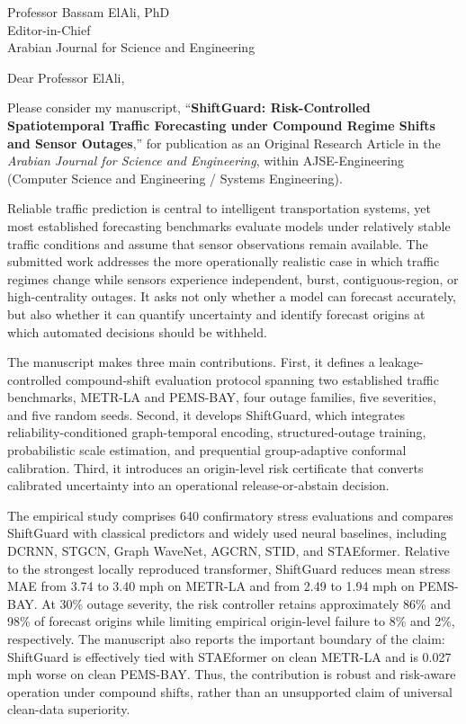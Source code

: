 \documentclass[10pt]{letter}
\begin{document}
\begin{letter}{Professor Bassam ElAli, PhD\\
Editor-in-Chief\\
Arabian Journal for Science and Engineering}

\opening{Dear Professor ElAli,}

Please consider my manuscript, ``\textbf{ShiftGuard: Risk-Controlled
Spatiotemporal Traffic Forecasting under Compound Regime Shifts and Sensor
Outages},'' for publication as an Original Research Article in the
\textit{Arabian Journal for Science and Engineering}, within AJSE-Engineering
(Computer Science and Engineering / Systems Engineering).

Reliable traffic prediction is central to intelligent transportation systems,
yet most established forecasting benchmarks evaluate models under relatively
stable traffic conditions and assume that sensor observations remain
available. The submitted work addresses the more operationally realistic case
in which traffic regimes change while sensors experience independent, burst,
contiguous-region, or high-centrality outages. It asks not only whether a model
can forecast accurately, but also whether it can quantify uncertainty and
identify forecast origins at which automated decisions should be withheld.

The manuscript makes three main contributions. First, it defines a
leakage-controlled compound-shift evaluation protocol spanning two established
traffic benchmarks, METR-LA and PEMS-BAY, four outage families, five severities,
and five random seeds. Second, it develops ShiftGuard, which integrates
reliability-conditioned graph-temporal encoding, structured-outage training,
probabilistic scale estimation, and prequential group-adaptive conformal
calibration. Third, it introduces an origin-level risk certificate that converts
calibrated uncertainty into an operational release-or-abstain decision.

The empirical study comprises 640 confirmatory stress evaluations and compares
ShiftGuard with classical predictors and widely used neural baselines,
including DCRNN, STGCN, Graph WaveNet, AGCRN, STID, and STAEformer. Relative to
the strongest locally reproduced transformer, ShiftGuard reduces mean stress
MAE from 3.74 to 3.40 mph on METR-LA and from 2.49 to 1.94 mph on PEMS-BAY. At
30\% outage severity, the risk controller retains approximately 86\% and 98\%
of forecast origins while limiting empirical origin-level failure to 8\% and
2\%, respectively. The manuscript also reports the important boundary of the
claim: ShiftGuard is effectively tied with STAEformer on clean METR-LA and is
0.027 mph worse on clean PEMS-BAY. Thus, the contribution is robust and
risk-aware operation under compound shifts, rather than an unsupported claim
of universal clean-data superiority.


\end{letter}
\end{document}
